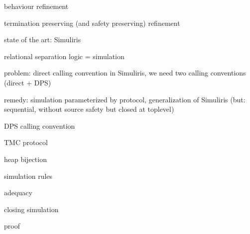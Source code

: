behaviour refinement

termination preserving (and safety preserving) refinement

state of the art: Simuliris

relational separation logic = simulation

problem: direct calling convention in Simuliris, we need two calling conventions (direct + DPS)

remedy: simulation parameterized by protocol, generalization of Simuliris (but: sequential, without source safety but closed at toplevel)

DPS calling convention

TMC protocol

heap bijection

simulation rules

adequacy

closing simulation

proof